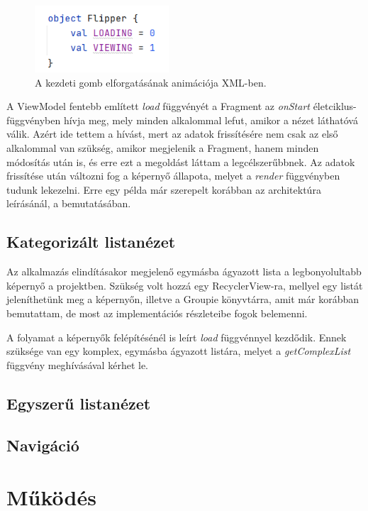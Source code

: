 \begin{figure}[!ht]
	\centering
	\includegraphics[width=50mm, keepaspectratio]{figures/viewflipper_object.png}
	\caption{A kezdeti gomb elforgatásának animációja XML-ben.}
	\label{fig:ViewFlipperObject}
\end{figure}

A ViewModel fentebb említett \emph{load} függvényét a Fragment az \emph{onStart} életciklus-függvényben hívja meg, mely minden alkalommal lefut, amikor a nézet láthatóvá válik. Azért ide tettem a hívást, mert az adatok frissítésére nem csak az első alkalommal van szükség, amikor megjelenik a Fragment, hanem minden módosítás után is, és erre ezt a megoldást láttam a legcélszerűbbnek. Az adatok frissítése után változni fog a képernyő állapota, melyet a \emph{render} függvényben tudunk lekezelni. Erre egy példa már szerepelt korábban az architektúra leírásánál, a  bemutatásában.

\subsection{Kategorizált listanézet}
Az alkalmazás elindításakor megjelenő egymásba ágyazott lista a legbonyolultabb képernyő a projektben. Szükség volt hozzá egy RecyclerView-ra, mellyel egy listát jeleníthetünk meg a képernyőn, illetve a Groupie könyvtárra, amit már korábban bemutattam, de most az implementációs részleteibe fogok belemenni. 

A folyamat a képernyők felépítésénél is leírt \emph{load} függvénnyel kezdődik. Ennek szüksége van egy komplex, egymásba ágyazott listára, melyet a \emph{getComplexList} függvény meghívásával kérhet le. 

\subsection{Egyszerű listanézet}

\subsection{Navigáció}

\section{Működés}

